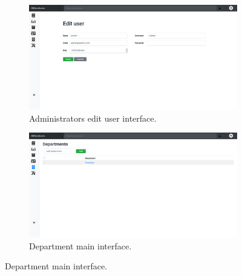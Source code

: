 \begin{figure}[H]\ContinuedFloat
	\centering
	\begin{subfigure}[b]{0.48\textwidth}
		\includegraphics[width=\textwidth]{billeder/iteration3Prototyper/EditUAdmin.png}
		\caption{Administrators edit user interface.}
		\label{fig:5-EditUAdmind}
	\end{subfigure}
	\quad
	\begin{subfigure}[b]{0.48\textwidth}
		\includegraphics[width=\textwidth]{billeder/iteration3Prototyper/Dep1.png}
		\caption{Department main interface.}
		\label{fig:5-Dep1}
	\end{subfigure}
\end{figure}
